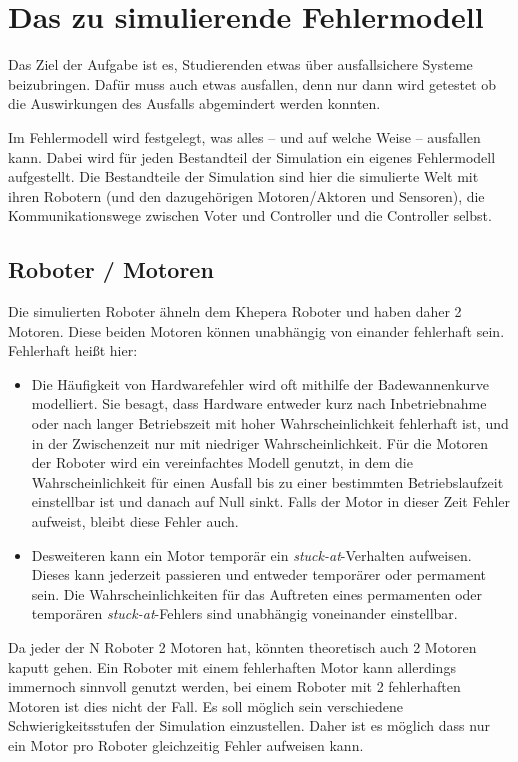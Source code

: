 \clearpage
\section{Das zu simulierende Fehlermodell}\label{fm}
Das Ziel der Aufgabe ist es, Studierenden etwas {\"{u}}ber ausfallsichere Systeme beizubringen. Daf{\"{u}}r
muss auch etwas ausfallen, denn nur dann wird getestet ob die Auswirkungen des Ausfalls abgemindert werden 
konnten.

Im Fehlermodell wird festgelegt, was alles -- und auf welche Weise -- ausfallen kann. Dabei wird f{\"{u}}r jeden Bestandteil der Simulation ein eigenes Fehlermodell aufgestellt. Die Bestandteile
der Simulation sind hier die simulierte Welt mit ihren Robotern (und den dazugeh{\"{o}}rigen Motoren/Aktoren
und Sensoren), die Kommunikationswege zwischen Voter und Controller und die Controller selbst.

\subsection{Roboter / Motoren}\label{fm-robot}
Die simulierten Roboter {\"{a}}hneln dem Khepera Roboter und haben daher 2 Motoren. Diese beiden Motoren k{\"{o}}nnen unabh{\"{a}}ngig von einander fehlerhaft sein. Fehlerhaft
hei{\ss}t hier:
\begin{itemize}
	\item Die H{\"{a}}ufigkeit von Hardwarefehler wird oft mithilfe der Badewannenkurve modelliert. Sie besagt,
		dass Hardware entweder kurz nach Inbetriebnahme oder nach langer Betriebszeit mit hoher
		Wahrscheinlichkeit fehlerhaft ist, und in der Zwischenzeit nur mit niedriger Wahrscheinlichkeit.
		F{\"{u}}r die Motoren der Roboter wird ein vereinfachtes Modell genutzt, in dem die Wahrscheinlichkeit 
		f{\"{u}}r einen Ausfall bis zu einer bestimmten Betriebslaufzeit einstellbar ist und danach auf
		Null sinkt. Falls der Motor in dieser Zeit Fehler aufweist, bleibt diese Fehler auch.
	\item Desweiteren kann ein Motor tempor{\"{a}}r ein \textit{stuck-at}-Verhalten aufweisen. Dieses
		kann jederzeit passieren und entweder tempor{\"{a}}rer oder permament sein.
		Die Wahrscheinlichkeiten f{\"{u}}r das Auftreten eines permamenten oder tempor{\"{a}}ren
		\textit{stuck-at}-Fehlers sind unabh{\"{a}}ngig voneinander einstellbar.
\end{itemize}

Da jeder der \gls{N} Roboter 2 Motoren hat, k{\"{o}}nnten theoretisch auch 2 Motoren kaputt gehen. Ein Roboter mit einem fehlerhaften Motor kann allerdings immernoch sinnvoll genutzt werden,
bei einem Roboter mit 2 fehlerhaften Motoren ist dies nicht der Fall. Es soll m{\"{o}}glich sein verschiedene 
Schwierigkeitsstufen der Simulation einzustellen. Daher ist es m{\"{o}}glich
dass nur ein Motor pro Roboter gleichzeitig Fehler aufweisen kann.

